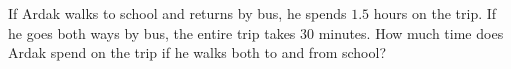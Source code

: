 If Ardak walks to school and returns by bus, he spends $1.5$ hours on the trip. If he goes both ways by bus, the entire trip takes $30$ minutes. How much time does Ardak spend on the trip if he walks both to and from school?
